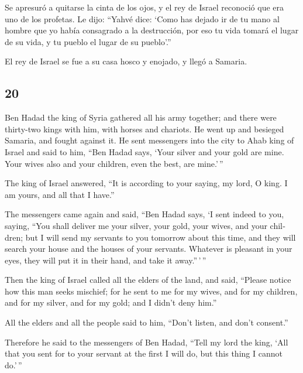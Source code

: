 \begin{paracol}{2}
 Se apresuró a quitarse la cinta de los ojos, y el rey de
Israel reconoció que era uno de los profetas.  Le dijo:
``Yahvé dice: `Como has dejado ir de tu mano al hombre que yo había
consagrado a la destrucción, por eso tu vida tomará el lugar de su vida,
y tu pueblo el lugar de su pueblo'.''

 El rey de Israel se fue a su casa hosco y enojado, y
llegó a Samaria.

\switchcolumn
\begin{otherlanguage}{english}

\hypertarget{section-39}{%
\section{20}\label{section-39}}

 Ben Hadad the king of Syria gathered all his army
together; and there were thirty-two kings with him, with horses and
chariots. He went up and besieged Samaria, and fought against it.
 He sent messengers into the city to Ahab king of Israel
and said to him, ``Ben Hadad says,  `Your silver and your
gold are mine. Your wives also and your children, even the best, are
mine.'\,''

 The king of Israel answered, ``It is according to your
saying, my lord, O king. I am yours, and all that I have.''

 The messengers came again and said, ``Ben Hadad says, `I
sent indeed to you, saying, ``You shall deliver me your silver, your
gold, your wives, and your children;  but I will send my
servants to you tomorrow about this time, and they will search your
house and the houses of your servants. Whatever is pleasant in your
eyes, they will put it in their hand, and take it away.''\,'\,''

 Then the king of Israel called all the elders of the
land, and said, ``Please notice how this man seeks mischief; for he sent
to me for my wives, and for my children, and for my silver, and for my
gold; and I didn't deny him.''

 All the elders and all the people said to him, ``Don't
listen, and don't consent.''

 Therefore he said to the messengers of Ben Hadad, ``Tell
my lord the king, `All that you sent for to your servant at the first I
will do, but this thing I cannot do.'\,''


\end{otherlanguage}
\end{paracol}
